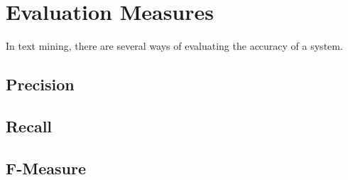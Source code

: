 \section{Evaluation Measures}
In text mining, there are several ways of evaluating the accuracy of a system.

\subsection{Precision}
\subsection{Recall}
\subsection{F-Measure}

